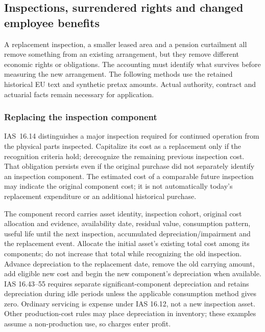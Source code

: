 \hypertarget{inspections-surrendered-rights-and-changed-employee-benefits}{%
\subsection{Inspections, surrendered rights and changed employee benefits}\label{inspections-surrendered-rights-and-changed-employee-benefits}}

A replacement inspection, a smaller leased area and a pension curtailment all remove something from an existing arrangement, but they remove different economic rights or obligations. The accounting must identify what survives before measuring the new arrangement. The following methods use the retained historical EU text and synthetic pretax amounts. Actual authority, contract and actuarial facts remain necessary for application.

\hypertarget{replacing-the-inspection-component}{%
\subsubsection{Replacing the inspection component}\label{replacing-the-inspection-component}}

IAS~16.14 \citep[IAS~16.12--14,43--55]{eu20231803} distinguishes a major inspection required for continued operation from the physical parts inspected. Capitalize its cost as a replacement only if the recognition criteria hold; derecognize the remaining previous inspection cost. That obligation persists even if the original purchase did not separately identify an inspection component. The estimated cost of a comparable future inspection may indicate the original component cost; it is not automatically today's replacement expenditure or an additional historical purchase.

The component record carries asset identity, inspection cohort, original cost allocation and evidence, availability date, residual value, consumption pattern, useful life until the next inspection, accumulated depreciation/impairment and the replacement event. Allocate the initial asset's existing total cost among its components; do not increase that total while recognizing the old inspection. Advance depreciation to the replacement date, remove the old carrying amount, add eligible new cost and begin the new component's depreciation when available. IAS 16.43--55 requires separate significant-component depreciation and retains depreciation during idle periods unless the applicable consumption method gives zero. Ordinary servicing is expense under IAS 16.12, not a new inspection asset. Other production-cost rules may place depreciation in inventory; these examples assume a non-production use, so charges enter profit.

